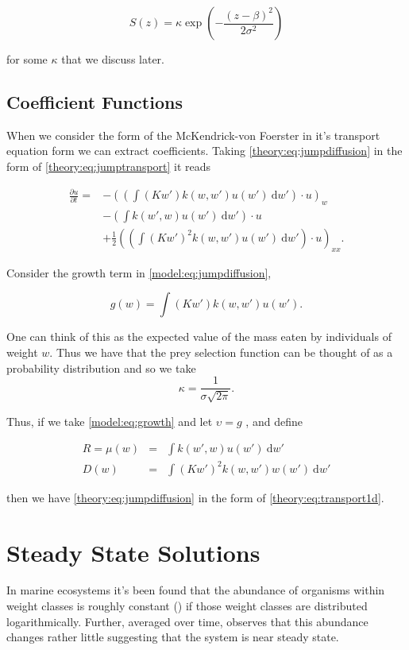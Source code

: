 \documentclass[../main]{subfiles}
\begin{document}
  \begin{equation}
    S(z) = \kappa \exp{\left( - \frac{(z - \beta)^2}{2 \sigma^2} \right)}
  \end{equation}

  for some $\kappa$ that we discuss later.

  \subsection{Coefficient Functions}
  When we consider the form of the McKendrick-von Foerster in it's transport equation form we can extract coefficients. Taking \autoref{theory:eq:jumpdiffusion} in the form of \autoref{theory:eq:jumptransport} it reads

  \begin{align}\label{model:eq:jumpdiffusion}
    \frac{\partial u}{\partial t} =
    & - \left( \left( \int (K w') k(w, w') u(w') \: \mathrm{d}w' \right) \cdot u \right)_w \nonumber \\
    & -  \left( \int k(w', w) u(w') \: \mathrm{d}w' \right) \cdot u \nonumber \\
    & + \frac{1}{2} \left( \left( \int (K w')^2 k(w, w') u(w') \: \mathrm{d}w' \right) \cdot u\right)_{xx}.
  \end{align}

  Consider the growth term in \autoref{model:eq:jumpdiffusion},

  \begin{equation}\label{model:eq:growth}
    g(w) = \int (K w') k(w, w') u(w').
  \end{equation}

  One can think of this as the expected value of the mass eaten by individuals of weight $w$. Thus we have that the prey selection function can be thought of as a probability distribution and so we take $$\kappa = \frac{1}{\sigma\sqrt{2 \pi}}.$$

  Thus, if we take \autoref{model:eq:growth} and let $\upsilon = g$ , and define

  \begin{eqnarray}
    R = \mu(w)  &=& \int k(w', w) u(w') \: \mathrm{d}w' \\
    D(w)    &=& \int (K w')^2 k(w, w') w(w') \: \mathrm{d}w'
  \end{eqnarray}

  then we have \autoref{theory:eq:jumpdiffusion} in the form of \autoref{theory:eq:transport1d}.

  \section{Steady State Solutions}
  In marine ecosystems it's been found that the abundance of organisms within weight classes is roughly constant (\cite{sheldon1972}) if those weight classes are distributed logarithmically. Further, averaged over time, \cite{datta2011} observes that this abundance changes rather little suggesting that the system is near steady state.
\end{document}
